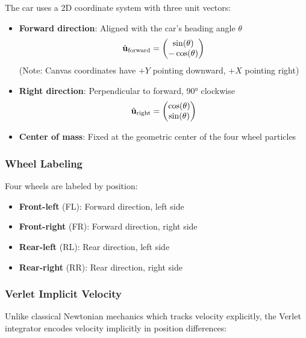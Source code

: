 The car uses a 2D coordinate system with three unit vectors:

\begin{itemize}
  \item \textbf{Forward direction}: Aligned with the car's heading angle $\theta$
    \begin{equation}
      \hat{\mathbf{u}}_{\text{forward}} = \begin{pmatrix} \sin(\theta) \\ -\cos(\theta) \end{pmatrix}
    \end{equation}
    (Note: Canvas coordinates have $+Y$ pointing downward, $+X$ pointing right)

  \item \textbf{Right direction}: Perpendicular to forward, 90° clockwise
    \begin{equation}
      \hat{\mathbf{u}}_{\text{right}} = \begin{pmatrix} \cos(\theta) \\ \sin(\theta) \end{pmatrix}
    \end{equation}

  \item \textbf{Center of mass}: Fixed at the geometric center of the four wheel particles
\end{itemize}

\subsubsection*{Wheel Labeling}

Four wheels are labeled by position:
\begin{itemize}
  \item \textbf{Front-left} (FL): Forward direction, left side
  \item \textbf{Front-right} (FR): Forward direction, right side
  \item \textbf{Rear-left} (RL): Rear direction, left side
  \item \textbf{Rear-right} (RR): Rear direction, right side
\end{itemize}

\subsubsection*{Verlet Implicit Velocity}

Unlike classical Newtonian mechanics which tracks velocity explicitly, the Verlet integrator encodes velocity implicitly in position differences:

